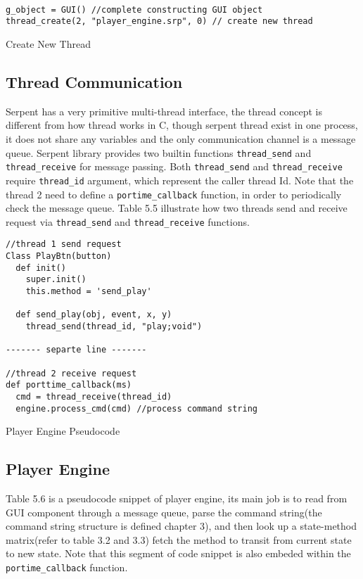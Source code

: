 \begin{table}[htdp]
\centering

\begin{lstlisting}

g_object = GUI() //complete constructing GUI object
thread_create(2, "player_engine.srp", 0) // create new thread

\end{lstlisting}

\caption[Create New Thread]{Create New Thread}
\end{table}

\subsection{Thread Communication}

Serpent has a very primitive multi-thread interface, the thread concept is 
different from how thread works in C, though serpent 
thread exist in one process, it does not share any variables and the only 
communication channel is a message queue. Serpent library provides two
builtin functions \texttt{thread\_send} and \texttt{thread\_receive} 
for message passing. Both \texttt{thread\_send} and \texttt{thread\_receive}
require \texttt{thread\_id} argument, which represent the caller thread Id. 
Note that the thread 2 need to define a \texttt{portime\_callback} function, 
in order to periodically check the message queue. Table 5.5 illustrate how 
two threads send and receive request via \texttt{thread\_send} and 
\texttt{thread\_receive} functions.
\begin{table}[htdp]
\centering
\begin{lstlisting}
//thread 1 send request 
Class PlayBtn(button)
  def init()
    super.init()
    this.method = 'send_play'

  def send_play(obj, event, x, y)
    thread_send(thread_id, "play;void")

------- separte line -------

//thread 2 receive request 
def porttime_callback(ms)
  cmd = thread_receive(thread_id)
  engine.process_cmd(cmd) //process command string
\end{lstlisting}
\caption[Player Engine Pseudocode]{Player Engine Pseudocode}
\end{table}

\subsection{Player Engine}
Table 5.6 is a pseudocode snippet of player engine, its main job is to read from  
GUI component through a message queue, parse the command string(the  
command string structure is defined chapter 3), and then look up a state-method 
matrix(refer to table 3.2 and 3.3) fetch the method to transit from current 
state to new state. Note that this segment of code snippet is also embeded 
within the \texttt{portime\_callback} function.


